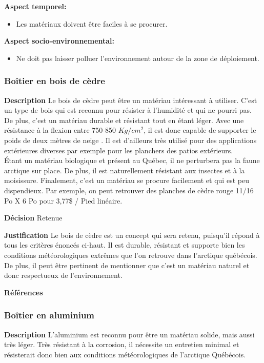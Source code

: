 \noindent\textbf{Aspect temporel:}
\begin{itemize}
    \item Les matériaux doivent être faciles à se procurer.
\end{itemize}

\noindent\textbf{Aspect socio-environnemental:}
\begin{itemize}
    \item Ne doit pas laisser polluer l'environnement autour de la zone de déploiement.
\end{itemize}


\subsubsection{Boîtier en bois de cèdre}
\label{sec:bois}
\noindent\textbf{Description} Le bois de cèdre peut être un matériau intéressant à utiliser. C'est un type de bois qui est reconnu pour résister à l'humidité et qui ne pourri pas. De plus, c'est un matériau durable et résistant tout en étant léger. Avec une résistance à la flexion entre 750-850 $Kg/cm^2$, il est donc capable de supporter le poids de deux mètres de neige \cite{Neige}. Il est d'ailleurs très utilisé pour des applications extérieures diverses par exemple pour les planchers des patios extérieurs. 
\\

Étant un matériau biologique et présent au Québec, il ne perturbera pas la faune arctique sur place. De plus, il est naturellement résistant aux insectes et à la moisissure. Finalement, c'est un matériau se procure facilement et qui est peu dispendieux. Par exemple, on peut retrouver des planches de cèdre rouge 11/16 Po X 6 Po pour 3,77\$ / Pied linéaire.
\smallskip

\noindent\textbf{Décision} Retenue
\smallskip

\noindent\textbf{Justification} Le bois de cèdre est un concept qui sera retenu, puisqu'il répond à tous les critères énoncés ci-haut. Il est durable, résistant et supporte bien les conditions météorologiques extrêmes que l'on retrouve dans l'arctique québécois. De plus, il peut être pertinent de mentionner que c'est un matériau naturel et donc respectueux de l'environnement.
\smallskip

\noindent\textbf{Références}
\cite{Bois1}
\cite{Bois2}

\subsubsection{Boîtier en aluminium}
\label{sec:alumi}
\noindent\textbf{Description} L'aluminium est reconnu pour être un matériau solide, mais aussi très léger. Très résistant à la corrosion, il nécessite un entretien minimal et résisterait donc bien aux conditions météorologiques de l'arctique Québécois. 
\\

